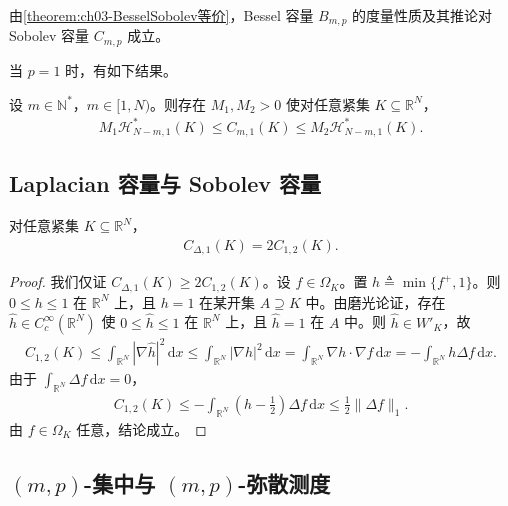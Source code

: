 \documentclass[../../main.tex]{subfiles}%
\begin{document}
由\cref{theorem:ch03-BesselSobolev等价}，Bessel 容量 $B_{m,p}$ 的度量性质及其推论对 Sobolev 容量 $C_{m,p}$ 成立。

当 $p=1$ 时，有如下结果。

\begin{theorem}\label{theorem:ch03-Cm1Hausdorff}
设 $m\in\mathbb{N}^*$，$m\in[1,N)$。则存在 $M_1,M_2>0$ 使对任意紧集 $K\subseteq\mathbb{R}^N$，
\begin{align}
M_1\mathcal{H}^*_{N-m,1}(K)\leqslant C_{m,1}(K)\leqslant M_2\mathcal{H}^*_{N-m,1}(K).\label{align:ch03-3.76}
\end{align}
\end{theorem}

\subsection{Laplacian 容量与 Sobolev 容量}\label{subsection:ch03-Laplacian}

\begin{proposition}\label{proposition:ch03-Laplacian=Sobolev}
对任意紧集 $K\subseteq\mathbb{R}^N$，
\begin{align}
C_{\Delta,1}(K)=2C_{1,2}(K).\label{align:ch03-3.77}
\end{align}
\end{proposition}

\begin{proof}
我们仅证 $C_{\Delta,1}(K)\geqslant2C_{1,2}(K)$。设 $f\in\Omega_K$。置 $h\triangleq \min\{f^+,1\}$。则 $0\leqslant h\leqslant1$ 在 $\mathbb{R}^N$ 上，且 $h=1$ 在某开集 $A\supseteq K$ 中。由磨光论证，存在 $\widehat h\in C^\infty_c(\mathbb{R}^N)$ 使 $0\leqslant\widehat h\leqslant1$ 在 $\mathbb{R}^N$ 上，且 $\widehat h=1$ 在 $A$ 中。则 $\widehat h\in W'_K$，故
\begin{align*}
C_{1,2}(K)\leqslant\int_{\mathbb{R}^N}|\nabla\widehat h|^2\,\mathrm{d}x
\leqslant\int_{\mathbb{R}^N}|\nabla h|^2\,\mathrm{d}x
=\int_{\mathbb{R}^N}\nabla h\cdot\nabla f\,\mathrm{d}x
=-\int_{\mathbb{R}^N}h\Delta f\,\mathrm{d}x.
\end{align*}
由于 $\int_{\mathbb{R}^N}\Delta f\,\mathrm{d}x=0$，
\begin{align*}
C_{1,2}(K)\leqslant-\int_{\mathbb{R}^N}\left(h-\frac12\right)\Delta f\,\mathrm{d}x
\leqslant\frac12\|\Delta f\|_1.
\end{align*}
由 $f\in\Omega_K$ 任意，结论成立。
\end{proof}

\subsection{$(m,p)$-集中与 $(m,p)$-弥散测度}\label{subsection:ch03-集中弥散}\label{subsection:ch03-集中分解}
\end{document}
